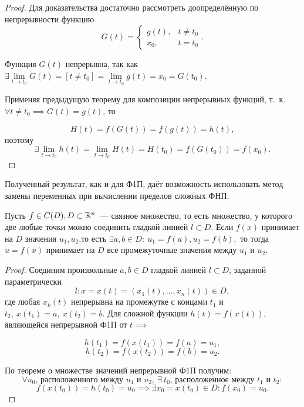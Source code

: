 \documentclass[../../main.tex]{subfiles}
\begin{document}
    \begin{proof}
    	Для доказательства достаточно рассмотреть доопределённую по непрерывности
    	функцию \begin{equation*}
    		G(t) = \begin{cases}
    			g(t),& t \ne t_0\\
    			x_0,& t = t_0 
    		\end{cases}.
    	\end{equation*} 
    	
    Функция $G(t)$ непрерывна, так как $\exists \lim\limits_{t \to t_0} G(t) = 
    \left[ t \ne t_0 \right] = \lim\limits_{t \to t_0} g(t) = x_0 = G(t_0)$.
    
    Применяя предыдущую теорему для композиции непрерывных функций, т.~к.
    $\forall t \ne t_0 \implies G(t) = g(t)$, то
    
    \[
      	H(t) = 
      	f(G(t)) = f(g(t)) = h(t),
    \]
    поэтому
    \[\exists \lim\limits_{t \to t_0} h(t) 
      	= \lim\limits_{t \to t_0} H(t) 
   		= H(t_0) = f(G(t_0)) = f(x_0).
    \]
    \end{proof}
    
	Полученный результат, как и для Ф1П, даёт возможность 
	использовать метод замены
	переменных при вычислении пределов сложных ФНП.
	
	\begin{thm}
		Пусть $f \in C(D), D \subset \mathbb{R}^n$~--- связное множество, то есть 
		множество, у которого две любые точки можно 
		соединить гладкой линией  $l \subset D$.
		Если $f(x)$ принимает на $D$ значения $u_1, u_2$,то есть $\exists 
		a, b \in D: \ u_1 = f(a), u_2 = f(b),$ то тогда $u = f(x)$ принимает
		на $D$ все промежуточные значения между $u_1$ и $u_2$.
	\end{thm}
	
	\begin{proof}
		Соединим произвольные $a, b \in D$ гладкой линией $l \subset D$, заданной 
		параметрически \[l: x = x(t) = (x_1(t), \ldots, x_n(t))\in D,\]
		где любая $x_k(t)$ непрерывна на промежутке с концами $t_1$ и $t_2,
		\ x(t_1) = a, \ x(t_2) = b$. Для сложной функции $h(t) = f(x(t))$, 
		являющейся непрерывной Ф1П от $t \implies$
		
		\[h(t_1) = f(x(t_1)) = f(a) = u_1,\]
		\[h(t_2) = f(x(t_2)) = f(b) = u_2.\]
		
		По теореме о множестве значений непрерывной Ф1П получим:
		\[
		\forall u_0 \text{, расположенного между } 
		u_1\text{ и } u_2 , \ \exists \ t_0
		\text{, расположенное между } t_1\text{ и } t_2 : 
		\]
		\[
		f(x(t_0)) = h(t_0) = u_0 \implies \exists x_0 = 
		x(t_0) \in D : f(x_0) = u_0.
		\]
	\end{proof}
	
\end{document}
